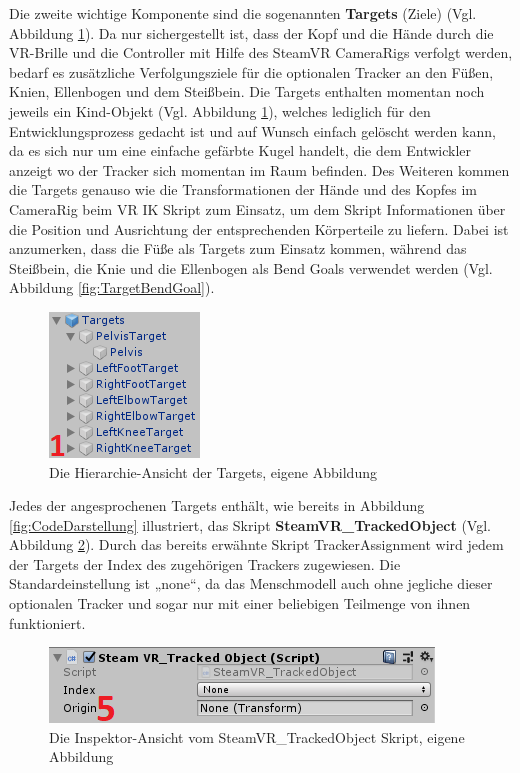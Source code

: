 \newline
Die zweite wichtige Komponente sind die sogenannten \textbf{Targets} (Ziele) (Vgl. Abbildung \ref{fig:Targets}). Da nur sichergestellt ist, dass der Kopf und die Hände durch die VR-Brille und die Controller mit Hilfe des SteamVR CameraRigs verfolgt werden, bedarf es zusätzliche Verfolgungsziele für die optionalen Tracker an den Füßen, Knien, Ellenbogen und dem Steißbein. Die Targets enthalten momentan noch jeweils ein Kind-Objekt (Vgl. Abbildung \ref{fig:Targets}), welches lediglich für den Entwicklungsprozess gedacht ist und auf Wunsch einfach gelöscht werden kann, da es sich nur um eine einfache gefärbte Kugel handelt, die dem Entwickler anzeigt wo der Tracker sich momentan im Raum befinden. Des Weiteren kommen die Targets genauso wie die Transformationen der Hände und des Kopfes im CameraRig beim VR IK Skript zum Einsatz, um dem Skript Informationen über die Position und Ausrichtung der entsprechenden Körperteile zu liefern. Dabei ist anzumerken, dass die Füße als Targets zum Einsatz kommen, während das Steißbein, die Knie und die Ellenbogen als Bend Goals verwendet werden (Vgl. Abbildung \ref{fig:TargetBendGoal}).
\begin{figure}[h]
	\centering
	\includegraphics[width=0.25\linewidth]{Bilder/A38_Targets2}
	\caption{Die Hierarchie-Ansicht der Targets, eigene Abbildung}
	\label{fig:Targets}
\end{figure}
\newline
Jedes der angesprochenen Targets enthält, wie bereits in Abbildung \ref{fig:CodeDarstellung} illustriert, das Skript \textbf{SteamVR\_TrackedObject} (Vgl. Abbildung \ref{fig:TrackedObject}). Durch das bereits erwähnte Skript TrackerAssignment wird jedem der Targets der Index des zugehörigen Trackers zugewiesen. Die Standardeinstellung ist „none“, da das Menschmodell auch ohne jegliche dieser optionalen Tracker und sogar nur mit einer beliebigen Teilmenge von ihnen funktioniert.
\begin{figure}[h]
	\centering
	\includegraphics[width=0.45\linewidth]{Bilder/A39_SteamVRTrackedObject2}
	\caption{Die Inspektor-Ansicht vom SteamVR\_TrackedObject Skript, eigene Abbildung}
	\label{fig:TrackedObject}
\end{figure}

